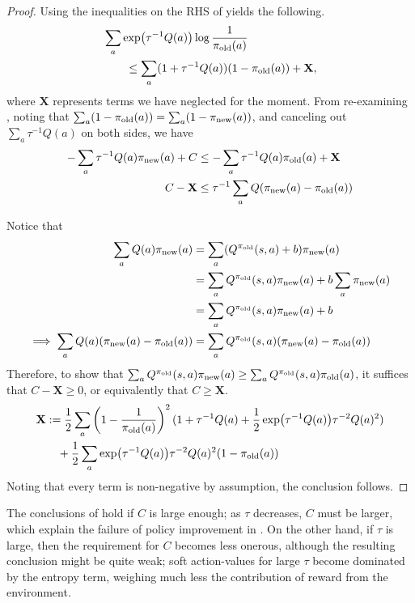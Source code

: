 \documentclass[\main/thesis.tex]{subfiles}
\begin{document}
\begin{proof}
Using the inequalities on the RHS of  yields the following. 
\begin{align*}
    &\sum_a \exp(\tau^{-1} Q(a)) \log\frac{1}{{\pi_\mathrm{old}}(a)}\\
    &\hspace{2em} \leq \sum_a (1 + \tau^{-1} Q(a))(1 - {\pi_\mathrm{old}}(a)) + \mathbf{X},
\end{align*}
where $\mathbf{X}$ represents terms we have neglected for the moment. From re-examining , noting that $\sum_a (1 - {\pi_\mathrm{old}}(a)) = \sum_a (1 - {\pi_\mathrm{new}}(a))$, and canceling out $\sum_a \tau^{-1} Q(a)$ on both sides, we have
\begin{align*}
    -\sum_a \tau^{-1}Q(a) {\pi_\mathrm{new}}(a) + C &\leq -\sum_a \tau^{-1}Q(a) {\pi_\mathrm{old}}(a) + \mathbf{X}\\
    C -\mathbf{X} &\leq \tau^{-1} \sum_a Q({\pi_\mathrm{new}}(a) - {\pi_\mathrm{old}}(a))
\end{align*}

Notice that 
\begin{align*}
\sum_a Q(a){\pi_\mathrm{new}}(a) &= \sum_a (Q^{{\pi_\mathrm{old}}}(s, a) + b ){\pi_\mathrm{new}}(a) \\
&=  \sum_a Q^{{\pi_\mathrm{old}}}(s, a) {\pi_\mathrm{new}}(a) +  b \sum_a {\pi_\mathrm{new}}(a) \\
&= \sum_a Q^{{\pi_\mathrm{old}}}(s, a) {\pi_\mathrm{new}}(a) +  b \\
\implies  \sum_a Q(a)({\pi_\mathrm{new}}(a) - {\pi_\mathrm{old}}(a)) &=  \sum_a Q^{{\pi_\mathrm{old}}}(s,a)({\pi_\mathrm{new}}(a) - {\pi_\mathrm{old}}(a))
\end{align*}
%
Therefore, to show that $\sum_a Q^{{\pi_\mathrm{old}}}(s,a){\pi_\mathrm{new}}(a) \ge \sum_a Q^{{\pi_\mathrm{old}}}(s,a){\pi_\mathrm{old}}(a)$, it suffices that $C -\mathbf{X} \geq 0$, or equivalently that $C \geq \mathbf{X}$. 
\begin{align*}
    \mathbf{X} &:=  \frac{1}{2}\sum_a  \left(1 - \frac{1}{{\pi_\mathrm{old}}(a)}\right)^2 (1 + \tau^{-1} Q(a) + \frac{1}{2}\exp(\tau^{-1} Q(a)) \tau^{-2} Q(a)^2) \\
    &\quad + \frac{1}{2} \sum_a \exp(\tau^{-1} Q(a)) \tau^{-2} Q(a)^2 (1 - {\pi_\mathrm{old}}(a))
\end{align*}
Noting that every term is non-negative by assumption, the conclusion follows.
\end{proof}
The conclusions of  hold if $C$ is large enough; as $\tau$ decreases, $C$ must be larger, which explain the failure of policy improvement in . On the other hand, if $\tau$ is large, then the requirement for $C$ becomes less onerous, although the resulting conclusion might be quite weak; soft action-values for large $\tau$ become dominated by the entropy term, weighing much less the contribution of reward from the environment. 
\end{document}

